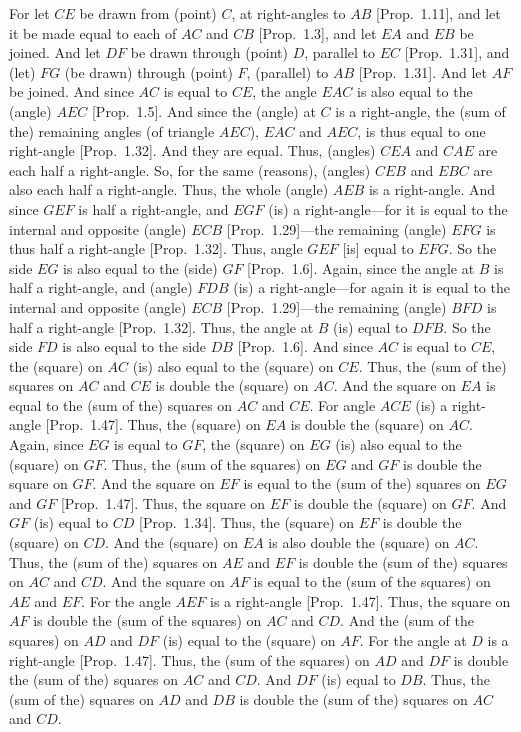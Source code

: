 \begin{Parallel}{}{}
{For let $CE$ be drawn from (point) $C$, at right-angles to $AB$ [Prop.~1.11], and let it be made equal to each of $AC$ and $CB$ [Prop.~1.3],
and let $EA$ and $EB$ be joined. And let $DF$ be drawn through
(point) $D$, parallel to $EC$ [Prop.~1.31], and (let) $FG$ (be drawn)
through (point) $F$, (parallel) to $AB$ [Prop.~1.31]. And let $AF$ be joined.
And since $AC$ is equal to $CE$,  the angle $EAC$ is also equal to the (angle) $AEC$ [Prop.~1.5]. And since the (angle) at $C$ is a right-angle, the (sum of the) remaining angles
(of triangle $AEC$), $EAC$ and $AEC$, is thus equal to one right-angle [Prop.~1.32].
And they are equal. Thus, (angles) $CEA$ and $CAE$ are each half a right-angle.
So, for the same (reasons), (angles) $CEB$ and $EBC$ are also each half a
right-angle. Thus, the whole (angle) $AEB$ is a right-angle. And since
$GEF$ is half a right-angle, and $EGF$ (is) a right-angle---for it is
equal to the internal and opposite  (angle) $ECB$ [Prop.~1.29]---the remaining (angle) $EFG$ is thus
half a right-angle [Prop.~1.32]. Thus, angle $GEF$ [is] equal to $EFG$.
So the side $EG$ is also equal to the (side) $GF$ [Prop.~1.6]. Again, since the angle
at $B$ is half a right-angle, and (angle) $FDB$ (is) a right-angle---for again
it is equal to the internal and opposite  (angle) $ECB$ [Prop.~1.29]---the
remaining (angle) $BFD$ is half a right-angle [Prop.~1.32]. Thus, the angle
at $B$ (is) equal to $DFB$. So the side $FD$ is also equal to the side $DB$ [Prop.~1.6]. And since $AC$ is equal to $CE$,  the (square) on $AC$ (is) also equal to the (square) on $CE$. Thus, the (sum of the) squares on $AC$ and $CE$
is double the (square) on $AC$. And the square on $EA$ is equal to the (sum
of the) squares on $AC$ and $CE$. For angle $ACE$ (is) 
a right-angle [Prop.~1.47].
Thus, the (square) on $EA$ is double the (square) on $AC$. Again,  since
$EG$ is equal to $GF$, the (square) on $EG$ (is) also equal  to 
the (square) on $GF$. 
Thus, the (sum of the squares)
on $EG$ and $GF$ is double the square on $GF$.
And the square on $EF$ is equal to the (sum of the) squares on $EG$ and $GF$
[Prop.~1.47]. Thus, the square on $EF$ is double the (square) on $GF$.
And $GF$ (is) equal to $CD$ [Prop.~1.34]. Thus, the (square) on $EF$ is double the
(square) on $CD$. And the (square) on $EA$ is also double the (square) on $AC$.
Thus, the (sum of the) squares on $AE$ and $EF$ is double the (sum of the)
squares on $AC$ and $CD$. And the square on $AF$ is equal to the
(sum of the squares) on $AE$ and $EF$. For the angle $AEF$ is a right-angle [Prop.~1.47]. Thus, the square on $AF$ is double the (sum of the squares) on 
$AC$ and $CD$. And the (sum of the squares) on $AD$ and $DF$ (is) equal to
the (square) on $AF$. For the angle at $D$ is a right-angle [Prop.~1.47].
Thus, the (sum of the squares) on $AD$ and $DF$ is double the (sum of the)
squares on $AC$ and $CD$. And $DF$ (is) equal to $DB$. Thus, the
(sum of the) squares on $AD$ and $DB$ is double the (sum of the) squares on
$AC$ and $CD$.

}
\end{Parallel}
